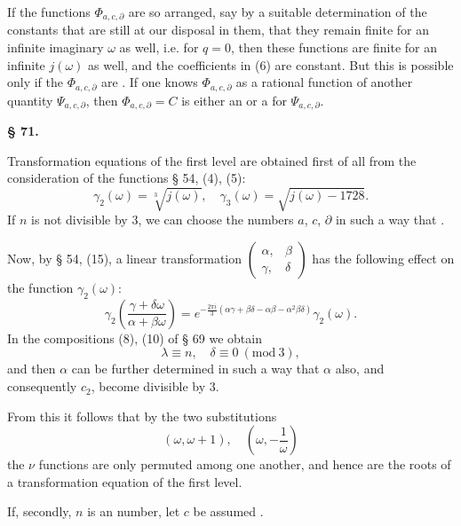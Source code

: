 If the functions $\Phi_{a,c,\partial}$ are so arranged, say by a
suitable determination of the constants that are still at our disposal
in them, that they remain finite for an infinite imaginary $\omega$ as
well, i.e. for $q=0$, then these functions are finite for an infinite
$j(\omega)$ as well, and the coefficients in (6) are constant. But
this is possible only if the $\Phi_{a,c,\partial}$ are . If one knows $\Phi_{a,c,\partial}$ as a
rational function of another quantity $\Psi_{a,c,\partial}$, then
$\Phi_{a,c,\partial} = C$ is either an  or a 
for $\Psi_{a,c,\partial}$.

\begin{center}
\textbf{§ 71. }
\end{center}

Transformation equations of the first level are obtained first of all
from the consideration of the functions § 54, (4), (5):
\[
\gamma_2(\omega) = \sqrt[3]{j(\omega)}, \quad \gamma_3(\omega) = \sqrt{j(\omega)-1728}.
\]
If $n$ is not divisible by 3, we can choose the numbers $a$, $c$,
$\partial$ in such a way that .

Now, by § 54, (15), a linear transformation
$\begin{pmatrix} \alpha, & \beta \\ \gamma, & \delta \end{pmatrix}$
has the following effect on the function $\gamma_2(\omega)$:
\[
\gamma_2\left(\frac{\gamma+\delta\omega}{\alpha+\beta\omega}\right) = e^{-\frac{2\pi i}{3}(\alpha\gamma+\beta\delta-\alpha\beta-\alpha^2\beta\delta)} \gamma_2(\omega).
\]
In the compositions (8), (10) of § 69 we obtain
\[
\lambda \equiv n, \quad \delta \equiv 0 \ (\mathrm{mod}\ 3),
\]
and then $\alpha$ can be further determined in such a way that
$\alpha$ also, and consequently $c_2$, become divisible by 3.

From this it follows that by the two substitutions
\[
(\omega, \omega+1), \quad \left(\omega, -\frac{1}{\omega}\right)
\]
the $\nu$ functions
are only permuted among one another, and hence are the roots of a
transformation equation of the first level.

If, secondly, $n$ is an  number, let $c$ be assumed
.
